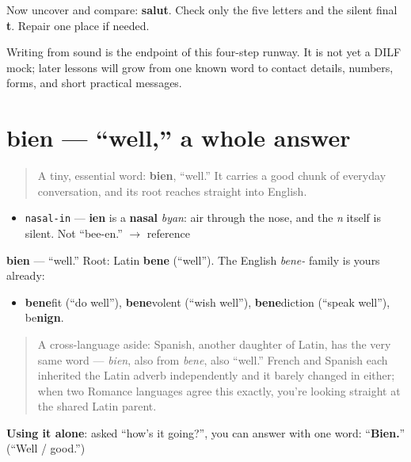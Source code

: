 Now uncover and compare: \textbf{salut}. Check only the five letters and the silent final \textbf{t}. Repair one place if needed.

\begin{tcolorbox}[breakable,colback=teal!4,colframe=teal!35!black,title={Before you move on}]
Writing from sound is the endpoint of this four-step runway. It is not yet a DILF mock; later lessons will grow from one known word to contact details, numbers, forms, and short practical messages.
\end{tcolorbox}
\section[bien]{bien — \textquotedblleft{}well,\textquotedblright{} a whole answer}

\label{lesson:FR-C01-bien}



\begin{quote}
A tiny, essential word: \textbf{bien}, \textquotedblleft{}well.\textquotedblright{} It carries a good chunk of everyday conversation, and its root reaches straight into English.
\end{quote}

\begin{sounds}
\begin{itemize}
\raggedright
  \item \texttt{nasal-in} — \textbf{ien} is a \textbf{nasal} \emph{byan}: air through the nose, and the \emph{n} itself is silent. Not \textquotedblleft{}bee-en.\textquotedblright{} $\to$ reference
\end{itemize}
\end{sounds}

\begin{cousinweb}
\textbf{bien} — \textquotedblleft{}well.\textquotedblright{} Root: Latin \textbf{bene} (\textquotedblleft{}well\textquotedblright{}). The English \emph{bene-} family is yours already:

\begin{itemize}
\raggedright
  \item \textbf{bene}fit (\textquotedblleft{}do well\textquotedblright{}), \textbf{bene}volent (\textquotedblleft{}wish well\textquotedblright{}), \textbf{bene}diction (\textquotedblleft{}speak well\textquotedblright{}), be\textbf{nign}.
\end{itemize}

\begin{quote}
A cross-language aside: Spanish, another daughter of Latin, has the very same word — \emph{bien}, also from \emph{bene}, also \textquotedblleft{}well.\textquotedblright{} French and Spanish each inherited the Latin adverb independently and it barely changed in either; when two Romance languages agree this exactly, you're looking straight at the shared Latin parent.
\end{quote}

\textbf{Using it alone}: asked \textquotedblleft{}how's it going?\textquotedblright{}, you can answer with one word: \textquotedblleft{}\textbf{Bien.}\textquotedblright{} (\textquotedblleft{}Well / good.\textquotedblright{})
\end{cousinweb}

